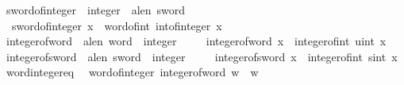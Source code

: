\begin{isabellebody}
\ sword{\isacharunderscore}{\kern0pt}of{\isacharunderscore}{\kern0pt}integer\ {\isacharcolon}{\kern0pt}{\isacharcolon}{\kern0pt}\ {\isachardoublequoteopen}integer\ {\isasymRightarrow}\ {\isacharprime}{\kern0pt}a{\isacharcolon}{\kern0pt}{\isacharcolon}{\kern0pt}len\ sword{\isachardoublequoteclose}\isanewline
\ \ \isanewline
\ \ {\isachardoublequoteopen}sword{\isacharunderscore}{\kern0pt}of{\isacharunderscore}{\kern0pt}integer\ x\ {\isasymequiv}\ word{\isacharunderscore}{\kern0pt}of{\isacharunderscore}{\kern0pt}int\ {\isacharparenleft}{\kern0pt}int{\isacharunderscore}{\kern0pt}of{\isacharunderscore}{\kern0pt}integer\ x{\isacharparenright}{\kern0pt}{\isachardoublequoteclose}\isanewline
\isanewline
{}\isamarkupfalse%
\ integer{\isacharunderscore}{\kern0pt}of{\isacharunderscore}{\kern0pt}word\ {\isacharcolon}{\kern0pt}{\isacharcolon}{\kern0pt}\ {\isachardoublequoteopen}{\isacharprime}{\kern0pt}a{\isacharcolon}{\kern0pt}{\isacharcolon}{\kern0pt}len\ word\ {\isasymRightarrow}\ integer{\isachardoublequoteclose}\isanewline
\ \ \isanewline
\ \ {\isachardoublequoteopen}integer{\isacharunderscore}{\kern0pt}of{\isacharunderscore}{\kern0pt}word\ x\ {\isasymequiv}\ integer{\isacharunderscore}{\kern0pt}of{\isacharunderscore}{\kern0pt}int\ {\isacharparenleft}{\kern0pt}uint\ x{\isacharparenright}{\kern0pt}{\isachardoublequoteclose}\isanewline
\isanewline
{}\isamarkupfalse%
\ integer{\isacharunderscore}{\kern0pt}of{\isacharunderscore}{\kern0pt}sword\ {\isacharcolon}{\kern0pt}{\isacharcolon}{\kern0pt}\ {\isachardoublequoteopen}{\isacharprime}{\kern0pt}a{\isacharcolon}{\kern0pt}{\isacharcolon}{\kern0pt}len\ sword\ {\isasymRightarrow}\ integer{\isachardoublequoteclose}\isanewline
\ \ \isanewline
\ \ {\isachardoublequoteopen}integer{\isacharunderscore}{\kern0pt}of{\isacharunderscore}{\kern0pt}sword\ x\ {\isasymequiv}\ integer{\isacharunderscore}{\kern0pt}of{\isacharunderscore}{\kern0pt}int\ {\isacharparenleft}{\kern0pt}sint\ x{\isacharparenright}{\kern0pt}{\isachardoublequoteclose}\isanewline
\isanewline
{}\isamarkupfalse%
\ word{\isacharunderscore}{\kern0pt}integer{\isacharunderscore}{\kern0pt}eq{\isacharcolon}{\kern0pt}\isanewline
\ \ {\isachardoublequoteopen}word{\isacharunderscore}{\kern0pt}of{\isacharunderscore}{\kern0pt}integer\ {\isacharparenleft}{\kern0pt}integer{\isacharunderscore}{\kern0pt}of{\isacharunderscore}{\kern0pt}word\ w{\isacharparenright}{\kern0pt}\ {\isacharequal}{\kern0pt}\ w{\isachardoublequoteclose}\isanewline
%
\isadelimproof
\ \ %
\endisadelimproof

\end{isabellebody}
